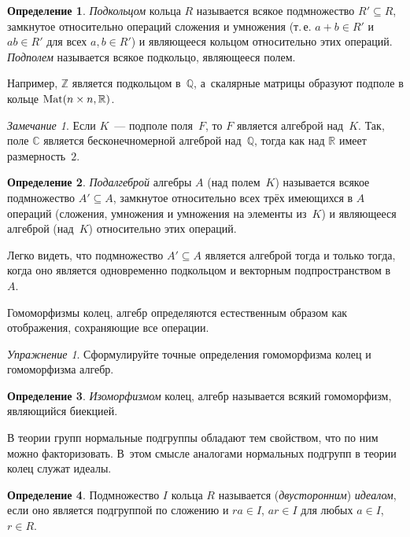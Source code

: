 \documentclass[a4paper,10pt]{amsart}
\def\Mat{{\rm Mat}}%
\def\CC{{\mathbb C}}%
\def\ZZ{{\mathbb Z}}%
\def\RR{{\mathbb R}}%
\def\QQ{{\mathbb Q}}%
\def\Mat{{\rm Mat}}
\theoremstyle{definition}
\newtheorem{definition}{Определение}
\theoremstyle{remark}
\newtheorem{exercise}{Упражнение}
\newtheorem{remark}{Замечание}
\begin{document}
\begin{definition}
\textit{Подкольцом} кольца $R$ называется всякое подмножество $R'
\subseteq R$, замкнутое относительно операций сложения и умножения
(т.\,е. $a + b \in R'$ и $ab \in R'$ для всех $a,b \in R'$) и
являющееся кольцом относительно этих операций. \textit{Подполем}
называется всякое подкольцо, являющееся полем.
\end{definition}

Например, $\ZZ$ является подкольцом в~$\QQ$, а~скалярные матрицы
образуют подполе в кольце $\Mat(n \times n, \RR)$.

\begin{remark}
Если $K$~--- подполе поля~$F$, то $F$ является алгеброй над~$K$.
Так, поле $\CC$ является бесконечномерной алгеброй над~$\QQ$, тогда
как над $\RR$ имеет размерность~$2$.
\end{remark}

\begin{definition}
\textit{Подалгеброй} алгебры $A$ (над полем~$K$) называется всякое
подмножество $A' \subseteq A$, замкнутое относительно всех трёх
имеющихся в $A$ операций (сложения, умножения и умножения на
элементы из~$K$) и являющееся алгеброй (над~$K$) относительно этих
операций.
\end{definition}

Легко видеть, что подмножество $A' \subseteq A$ является алгеброй
тогда и только тогда, когда оно является одновременно подкольцом и
векторным подпространством в~$A$.

Гомоморфизмы колец, алгебр определяются естественным образом как
отображения, сохраняющие все операции.

\begin{exercise}
Сформулируйте точные определения гомоморфизма колец и гомоморфизма
алгебр.
\end{exercise}

\begin{definition}
\textit{Изоморфизмом} колец, алгебр называется всякий гомоморфизм,
являющийся биекцией.
\end{definition}

В теории групп нормальные подгруппы обладают тем свойством, что по
ним можно \guillemotleft факторизовать\guillemotright{}. В~этом
смысле аналогами нормальных подгрупп в теории колец служат идеалы.

\begin{definition}
Подмножество $I$ кольца $R$ называется (\textit{двусторонним}) {\it
идеалом}, если оно является подгруппой по сложению и $ra\in I$,
$ar\in I$ для любых $a\in I$, $r\in R$.
\end{definition}
\end{document}
